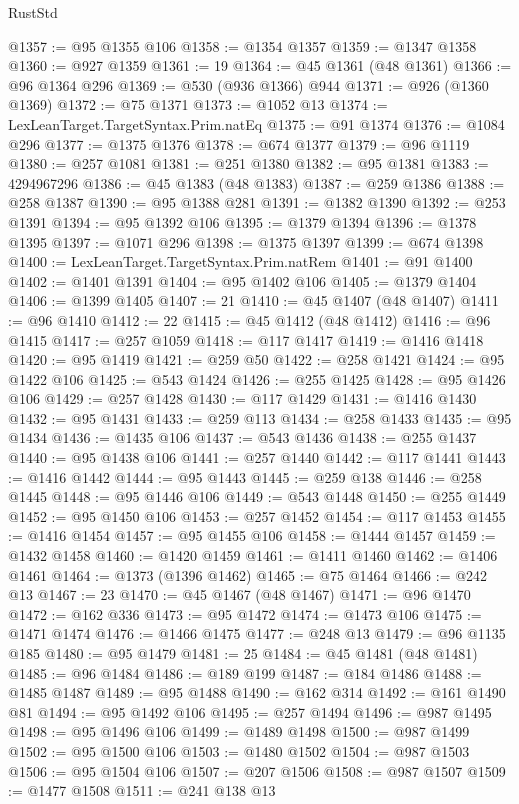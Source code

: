 \begin{lexlean}{RustStd}
\begin{coremodule}
{\begin{coremodule}
{{{{{{{{{{{{{{{{{{{{{{{{{{{{{{{{{{{{{{{@1357 := @95 @1355 @106
@1358 := @1354 @1357
@1359 := @1347 @1358
@1360 := @927 @1359
@1361 := 19
@1364 := @45 @1361 (@48 @1361)
@1366 := @96 @1364 @296
@1369 := @530 (@936 @1366) @944
@1371 := @926 (@1360 @1369)
@1372 := @75 @1371
@1373 := @1052 @13
@1374 := LexLeanTarget.TargetSyntax.Prim.natEq
@1375 := @91 @1374
@1376 := @1084 @296
@1377 := @1375 @1376
@1378 := @674 @1377
@1379 := @96 @1119
@1380 := @257 @1081
@1381 := @251 @1380
@1382 := @95 @1381
@1383 := 4294967296
@1386 := @45 @1383 (@48 @1383)
@1387 := @259 @1386
@1388 := @258 @1387
@1390 := @95 @1388 @281
@1391 := @1382 @1390
@1392 := @253 @1391
@1394 := @95 @1392 @106
@1395 := @1379 @1394
@1396 := @1378 @1395
@1397 := @1071 @296
@1398 := @1375 @1397
@1399 := @674 @1398
@1400 := LexLeanTarget.TargetSyntax.Prim.natRem
@1401 := @91 @1400
@1402 := @1401 @1391
@1404 := @95 @1402 @106
@1405 := @1379 @1404
@1406 := @1399 @1405
@1407 := 21
@1410 := @45 @1407 (@48 @1407)
@1411 := @96 @1410
@1412 := 22
@1415 := @45 @1412 (@48 @1412)
@1416 := @96 @1415
@1417 := @257 @1059
@1418 := @117 @1417
@1419 := @1416 @1418
@1420 := @95 @1419
@1421 := @259 @50
@1422 := @258 @1421
@1424 := @95 @1422 @106
@1425 := @543 @1424
@1426 := @255 @1425
@1428 := @95 @1426 @106
@1429 := @257 @1428
@1430 := @117 @1429
@1431 := @1416 @1430
@1432 := @95 @1431
@1433 := @259 @113
@1434 := @258 @1433
@1435 := @95 @1434
@1436 := @1435 @106
@1437 := @543 @1436
@1438 := @255 @1437
@1440 := @95 @1438 @106
@1441 := @257 @1440
@1442 := @117 @1441
@1443 := @1416 @1442
@1444 := @95 @1443
@1445 := @259 @138
@1446 := @258 @1445
@1448 := @95 @1446 @106
@1449 := @543 @1448
@1450 := @255 @1449
@1452 := @95 @1450 @106
@1453 := @257 @1452
@1454 := @117 @1453
@1455 := @1416 @1454
@1457 := @95 @1455 @106
@1458 := @1444 @1457
@1459 := @1432 @1458
@1460 := @1420 @1459
@1461 := @1411 @1460
@1462 := @1406 @1461
@1464 := @1373 (@1396 @1462)
@1465 := @75 @1464
@1466 := @242 @13
@1467 := 23
@1470 := @45 @1467 (@48 @1467)
@1471 := @96 @1470
@1472 := @162 @336
@1473 := @95 @1472
@1474 := @1473 @106
@1475 := @1471 @1474
@1476 := @1466 @1475
@1477 := @248 @13
@1479 := @96 @1135 @185
@1480 := @95 @1479
@1481 := 25
@1484 := @45 @1481 (@48 @1481)
@1485 := @96 @1484
@1486 := @189 @199
@1487 := @184 @1486
@1488 := @1485 @1487
@1489 := @95 @1488
@1490 := @162 @314
@1492 := @161 @1490 @81
@1494 := @95 @1492 @106
@1495 := @257 @1494
@1496 := @987 @1495
@1498 := @95 @1496 @106
@1499 := @1489 @1498
@1500 := @987 @1499
@1502 := @95 @1500 @106
@1503 := @1480 @1502
@1504 := @987 @1503
@1506 := @95 @1504 @106
@1507 := @207 @1506
@1508 := @987 @1507
@1509 := @1477 @1508
@1511 := @241 @138 @13
}}}}}}}}}}}}}}}}}}}}}}}}}}}}}}}}}}}}}}}
\end{coremodule}}
\end{coremodule}
\end{lexlean}
